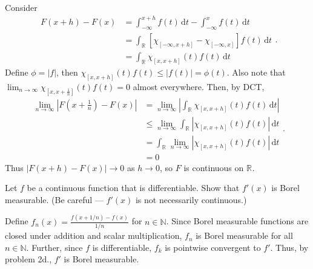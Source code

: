 \begin{solution}
  Consider 
  \[
  \begin{aligned}
    F(x+h) - F(x) &= \int_{ -\infty}^{x + h} \! f(t) \, \mathrm{d}t - \int_{ -\infty}^{x} \! f(t) \, \mathrm{d}t \\
                  &= \int_{ \mathbb{R}^{}} \! \left[ \chi_{\left[ -\infty, x + h \right]} - \chi_{\left[ -\infty, x \right]} \right] f(t) \, \mathrm{d}t \\
                  &= \int_{ \mathbb{R}^{}} \! \chi_{\left[ x, x + h \right]}(t) f(t)  \, \mathrm{d}t
  \end{aligned}
  .\] 
  Define $\phi = \left| f \right|$, then $\chi_{\left[ x, x + h \right]}(t) f(t) \leq \left| f(t) \right| = \phi(t)$.
  Also note that $\lim_{n \to \infty} \chi_{\left[ x, x + \frac{1}{n} \right]}(t) f(t) = 0$ almost everywhere.
  Then, by DCT,
  \[
  \begin{aligned}
    \lim_{n \to \infty} \left| F\left( x + \frac{1}{n} \right) - F(x) \right| &= \lim_{n \to \infty}  \left| \int_{ \mathbb{R}^{}} \! \chi_{\left[ x, x + h \right]}(t) f(t)  \, \mathrm{d}t \right| \\
                                                                              &\leq \lim_{n \to \infty}   \int_{ \mathbb{R}^{}} \! \left| \chi_{\left[ x, x + h \right]}(t) f(t) \right| \, \mathrm{d}t \\
                                                                              &=  \int_{ \mathbb{R}^{}} \! \lim_{n \to \infty} \left| \chi_{\left[ x, x + h \right]}(t) f(t) \right| \, \mathrm{d}t \\
                                                                              &= 0
  \end{aligned}
  .\] 
  Thus $\left| F(x + h) - F(x) \right| \to 0$ as $h \to 0$, so $F$ is continuous on $\mathbb{R}^{}$.
\end{solution}


\pagebreak


\begin{problem}{5}
  Let $f$ be a continuous function that is differentiable. Show that $f'(x)$ is Borel measurable. (Be careful — $f'(x)$ is not necessarily continuous.)
\end{problem}

\begin{solution}
  Define $f_{n}(x) = \frac{f\left( x+1/n \right) - f(x)}{1/n}$ for $n \in \mathbb{N}$.
  Since Borel measurable functions are closed under addition and scalar multiplication, $f_{n}$ is Borel measurable for all $n \in \mathbb{N}$.
  Further, since $f$ is differentiable, $f_{k}$ is pointwise convergent to $f'$.
  Thus, by problem 2d., $f'$ is Borel measurable.
  

\end{solution}


